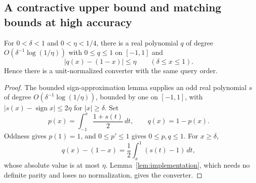 \subsection{A contractive upper bound and matching bounds at high accuracy}
\begin{proposition}\label{prop:integrated-sign}
For $0<\delta<1$ and $0<\eta<1/4$, there is a real polynomial $q$ of degree
$O(\delta^{-1}\log(1/\eta))$ with $0\leq q\leq1$ on $[-1,1]$ and
\[
 |q(x)-(1-x)|\leq\eta\qquad(\delta\leq x\leq1).
\]
Hence there is a unit-normalized converter with the same query order.
\end{proposition}
\begin{proof}
The bounded sign-approximation lemma \cite[Lemma 25, extended version]{gilyen2019} supplies an odd real polynomial $s$ of degree $O(\delta^{-1}\log(1/\eta))$, bounded by one on $[-1,1]$, with $|s(x)-\operatorname{sign}x|\leq2\eta$ for $|x|\geq\delta$. Set
\[
 p(x)=\int_{-1}^x\frac{1+s(t)}2\,dt,\qquad q(x)=1-p(x).
\]
Oddness gives $p(1)=1$, and $0\leq p'\leq1$ gives $0\leq p,q\leq1$. For $x\geq\delta$,
\[
 q(x)-(1-x)=\frac12\int_x^1(s(t)-1)\,dt,
\]
whose absolute value is at most $\eta$. Lemma~\ref{lem:implementation}, which needs no definite parity and loses no normalization, gives the converter.
\end{proof}


